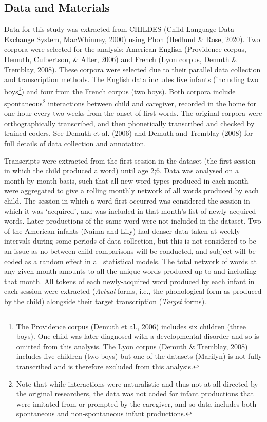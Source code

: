 \documentclass[
  man]{apa6}
\begin{document}
\hypertarget{data-and-materials}{%
\subsection{Data and Materials}\label{data-and-materials}}

Data for this study was extracted from CHILDES (Child Language Data Exchange System, MacWhinney, 2000) using Phon (Hedlund \& Rose, 2020). Two corpora were selected for the analysis: American English (Providence corpus, Demuth, Culbertson, \& Alter, 2006) and French (Lyon corpus, Demuth \& Tremblay, 2008). These corpora were selected due to their parallel data collection and transcription methods. The English data includes five infants (including two boys\footnote{The Providence corpus (Demuth et al., 2006) includes six children (three boys). One child was later diagnosed with a developmental disorder and so is omitted from this analysis. The Lyon corpus (Demuth \& Tremblay, 2008) includes five children (two boys) but one of the datasets (Marilyn) is not fully transcribed and is therefore excluded from this analysis.}) and four from the French corpus (two boys). Both corpora include spontaneous\footnote{Note that while interactions were naturalistic and thus not at all directed by the original researchers, the data was not coded for infant productions that were imitated from or prompted by the caregiver, and so data includes both spontaneous and non-spontaneous infant productions.} interactions between child and caregiver, recorded in the home for one hour every two weeks from the onset of first words. The original corpora were orthographically transcribed, and then phonetically transcribed and checked by trained coders. See Demuth et al. (2006) and Demuth and Tremblay (2008) for full details of data collection and annotation.

Transcripts were extracted from the first session in the dataset (the first session in which the child produced a word) until age 2;6. Data was analysed on a month-by-month basis, such that all new word types produced in each month were aggregated to give a rolling monthly network of all words produced by each child. The session in which a word first occurred was considered the session in which it was `acquired', and was included in that month's list of newly-acquired words. Later productions of the same word were not included in the dataset. Two of the American infants (Naima and Lily) had denser data taken at weekly intervals during some periods of data collection, but this is not considered to be an issue as no between-child comparisons will be conducted, and subject will be coded as a random effect in all statistical models. The total network of words at any given month amounts to all the unique words produced up to and including that month. All tokens of each newly-acquired word produced by each infant in each session were extracted (\emph{Actual} forms, i.e., the phonological form as produced by the child) alongside their target transcription (\emph{Target} forms).
\end{document}
